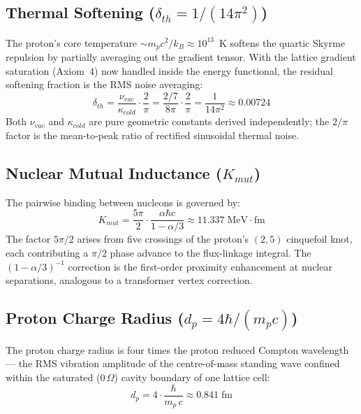 \subsection{Thermal Softening ($\delta_{th} = 1/(14\pi^2)$)}

The proton's core temperature $\sim m_p c^2 / k_B \approx 10^{13}$~K
softens the quartic Skyrme repulsion by partially averaging out the
gradient tensor.  With the lattice gradient saturation (Axiom~4) now
handled inside the energy functional, the residual softening fraction
is the RMS noise averaging:
\begin{equation}
    \delta_{th} = \frac{\nu_{vac}}{\kappa_{cold}} \cdot \frac{2}{\pi}
    = \frac{2/7}{8\pi} \cdot \frac{2}{\pi} = \frac{1}{14\pi^2} \approx 0.00724
\end{equation}
Both $\nu_{vac}$ and $\kappa_{cold}$ are pure geometric constants
derived independently; the $2/\pi$ factor is the mean-to-peak ratio
of rectified sinusoidal thermal noise.

\subsection{Nuclear Mutual Inductance ($K_{mut}$)}

The pairwise binding between nucleons is governed by:
\begin{equation}
    K_{mut} = \frac{5\pi}{2} \cdot \frac{\alpha \hbar c}{1 - \alpha/3}
    \approx 11.337\;\text{MeV}\cdot\text{fm}
\end{equation}
The factor $5\pi/2$ arises from five crossings of the proton's
$(2,5)$ cinquefoil knot, each contributing a $\pi/2$ phase advance
to the flux-linkage integral.  The $(1 - \alpha/3)^{-1}$ correction
is the first-order proximity enhancement at nuclear separations,
analogous to a transformer vertex correction.

\subsection{Proton Charge Radius ($d_p = 4\hbar/(m_p c)$)}

The proton charge radius is four times the proton reduced Compton
wavelength --- the RMS vibration amplitude of the centre-of-mass
standing wave confined within the saturated ($0\,\Omega$) cavity
boundary of one lattice cell:
\begin{equation}
    d_p = 4 \cdot \frac{\hbar}{m_p \, c} \approx 0.841\;\text{fm}
\end{equation}

